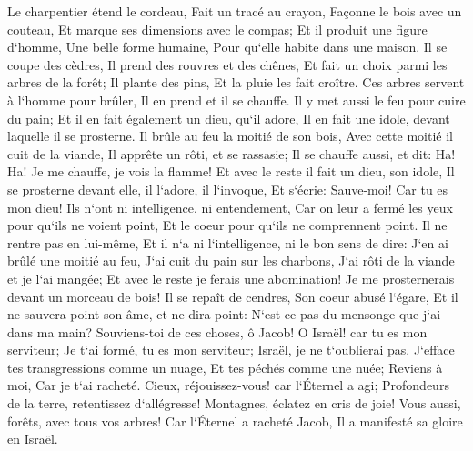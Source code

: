 \verse Le charpentier étend le cordeau, Fait un tracé au crayon, Façonne le bois avec un couteau, Et marque ses dimensions avec le compas; Et il produit une figure d`homme, Une belle forme humaine, Pour qu`elle habite dans une maison. 
\verse Il se coupe des cèdres, Il prend des rouvres et des chênes, Et fait un choix parmi les arbres de la forêt; Il plante des pins, Et la pluie les fait croître. 
\verse Ces arbres servent à l`homme pour brûler, Il en prend et il se chauffe. Il y met aussi le feu pour cuire du pain; Et il en fait également un dieu, qu`il adore, Il en fait une idole, devant laquelle il se prosterne. 
\verse Il brûle au feu la moitié de son bois, Avec cette moitié il cuit de la viande, Il apprête un rôti, et se rassasie; Il se chauffe aussi, et dit: Ha! Ha! Je me chauffe, je vois la flamme! 
\verse Et avec le reste il fait un dieu, son idole, Il se prosterne devant elle, il l`adore, il l`invoque, Et s`écrie: Sauve-moi! Car tu es mon dieu! 
\verse Ils n`ont ni intelligence, ni entendement, Car on leur a fermé les yeux pour qu`ils ne voient point, Et le coeur pour qu`ils ne comprennent point. 
\verse Il ne rentre pas en lui-même, Et il n`a ni l`intelligence, ni le bon sens de dire: J`en ai brûlé une moitié au feu, J`ai cuit du pain sur les charbons, J`ai rôti de la viande et je l`ai mangée; Et avec le reste je ferais une abomination! Je me prosternerais devant un morceau de bois! 
\verse Il se repaît de cendres, Son coeur abusé l`égare, Et il ne sauvera point son âme, et ne dira point: N`est-ce pas du mensonge que j`ai dans ma main? 
\verse Souviens-toi de ces choses, ô Jacob! O Israël! car tu es mon serviteur; Je t`ai formé, tu es mon serviteur; Israël, je ne t`oublierai pas. 
\verse J`efface tes transgressions comme un nuage, Et tes péchés comme une nuée; Reviens à moi, Car je t`ai racheté. 
\verse Cieux, réjouissez-vous! car l`Éternel a agi; Profondeurs de la terre, retentissez d`allégresse! Montagnes, éclatez en cris de joie! Vous aussi, forêts, avec tous vos arbres! Car l`Éternel a racheté Jacob, Il a manifesté sa gloire en Israël. 
